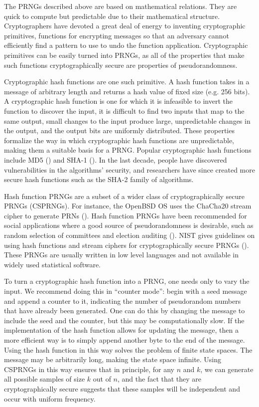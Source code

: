 \documentclass[12pt]{article}
\begin{document}
The PRNGs described above are based on mathematical relations.
They are quick to compute but predictable due to their mathematical structure.
Cryptographers have devoted a great deal of energy to inventing cryptographic primitives,
functions for encrypting messages so that an adversary cannot efficiently find a pattern to use to undo the function application.
Cryptographic primitives can be easily turned into PRNGs, as all of the properties that make such functions cryptographically secure
are properties of pseudorandomness.

Cryptographic hash functions are one such primitive.
A hash function takes in a message of arbitrary length and returns a hash value of fixed size (e.g. 256 bits).
A cryptographic hash function is one for which it is infeasible to invert the function to discover the input,
 it is difficult to find two inputs that map to the same output,
 small changes to the input produce large, unpredictable changes in the output,
 and the output bits are uniformly distributed.
These properties formalize the way in which cryptographic hash functions are unpredictable, making them a suitable basis for a PRNG.
Popular cryptographic hash functions include MD5 (\cite{rivest_md5_1992}) and SHA-1 (\cite{eastlake_us_2001}).
In the last decade, people have discovered vulnerabilities in the algorithms' security, and researchers have since created more secure hash functions such as the SHA-2 family of algorithms.

Hash function PRNGs are a subset of a wider class of cryptographically secure PRNGs (CSPRNGs).
For instance, the OpenBSD OS uses the ChaCha20 stream cipher to generate PRNs (\cite{openbsd_arc4random_2014, chacha_bernstein_208}).
Hash function PRNGs have been recommended for social applications where a good source of pseudorandomness is desirable, such as random selection of committees and election auditing (\cite{publicly_motorola_2004, rivest_reference_2011}).
NIST gives guidelines on using hash functions and stream ciphers for cryptographically secure PRNGs (\cite{barker_nist_2015}).
These PRNGs are usually written in low level languages and not available in widely used statistical software.

To turn a cryptographic hash function into a PRNG, one needs only to vary the input.
We recommend doing this in ``counter mode'':
begin with a seed message and append a counter to it, indicating the number of pseudorandom numbers that have already been generated.
One can do this by changing the message to include the seed and the counter, but this may be computationally slow.
If the implementation of the hash function allows for updating the message, then a more efficient way is to simply append another byte to the end of the message.
Using the hash function in this way solves the problem of finite state spaces.
The message may be arbitrarily long, making the state space infinite.
Using CSPRNGs in this way ensures that in principle, for any $n$ and $k$, we can generate all possible samples of size $k$ out of $n$, and the fact that they are cryptographically secure suggests that these samples will be independent and occur with uniform frequency.
\end{document}
